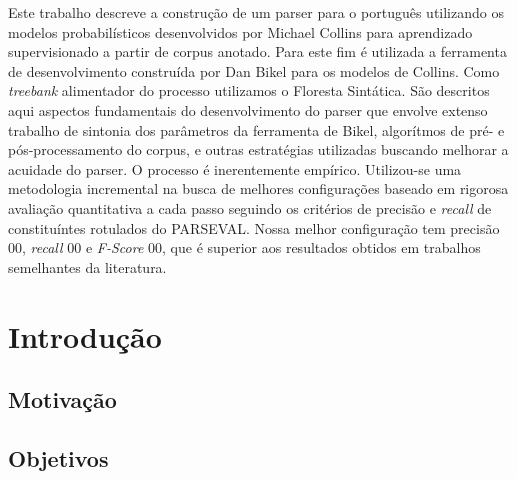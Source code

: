 \documentclass[a4paper]{abnt}
\begin{document}


\pagestyle{plain}


\begin{resumo}

Este trabalho descreve a construção de um parser para o português utilizando os modelos probabilísticos desenvolvidos por Michael Collins para aprendizado supervisionado a partir de corpus anotado. 
Para este fim é utilizada a ferramenta de desenvolvimento construída por Dan Bikel para os modelos de Collins. 
Como \emph{treebank} alimentador do processo utilizamos o Floresta Sintática.
São descritos aqui aspectos fundamentais do desenvolvimento do parser que envolve extenso trabalho de sintonia dos parâmetros da ferramenta de Bikel, algorítmos de pré- e pós-processamento do corpus, e outras estratégias utilizadas buscando melhorar a acuidade do parser. 
O processo é inerentemente empírico. Utilizou-se uma metodologia incremental na busca de melhores configurações baseado em rigorosa avaliação quantitativa a cada passo seguindo os critérios de precisão e \emph{recall} de constituíntes rotulados do PARSEVAL. 
Nossa melhor configuração tem precisão 00, \emph{recall} 00 e \emph{F-Score} 00, que é superior aos resultados obtidos em trabalhos semelhantes da literatura.

\end{resumo}

\tableofcontents
\listoffigures
\listoftables

%


\setcounter{page}{0}

\chapter{Introdução}
\label{cha:introducao}
\thispagestyle{empty}
    

\section{Motivação}
\label{sec:motivacao}
	

\section{Objetivos}
\label{sec:objetivos}
	
\end{document}
